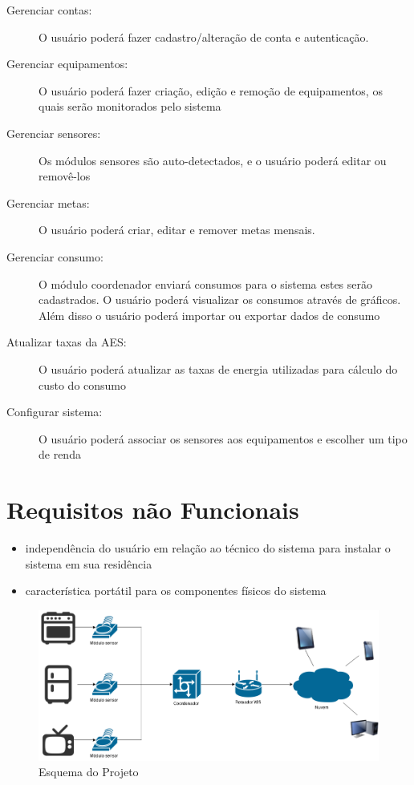 \begin{description}
	\item[Gerenciar contas:] O usuário poderá fazer cadastro/alteração de conta e autenticação.
	\item[Gerenciar equipamentos:] O usuário poderá fazer criação, edição e remoção de equipamentos, os quais serão monitorados pelo sistema
	\item[Gerenciar sensores:] Os módulos sensores são auto-detectados, e o usuário poderá editar ou removê-los
	\item[Gerenciar metas:] O usuário poderá criar, editar e remover metas mensais.
	\item[Gerenciar consumo:] O módulo coordenador enviará consumos para o sistema estes serão cadastrados. O usuário poderá visualizar os consumos através de gráficos. Além disso o usuário poderá importar ou exportar dados de consumo
	\item[Atualizar taxas da AES:] O usuário poderá atualizar as taxas de energia utilizadas para cálculo do custo do consumo
	\item[Configurar sistema:] O usuário poderá associar os sensores aos equipamentos e escolher um tipo de renda
\end{description}

\section{Requisitos não Funcionais}

\begin{itemize}
	\item{independência do usuário em relação ao técnico do sistema para instalar o sistema em sua residência}
	\item{característica portátil para os componentes físicos do sistema}
\end{itemize}



\begin{figure}
\centering
\includegraphics[width=1\textwidth]{figuras/esqueminha.png}
\caption{\label{fig:esqueminha} Esquema do Projeto}
\end{figure}

